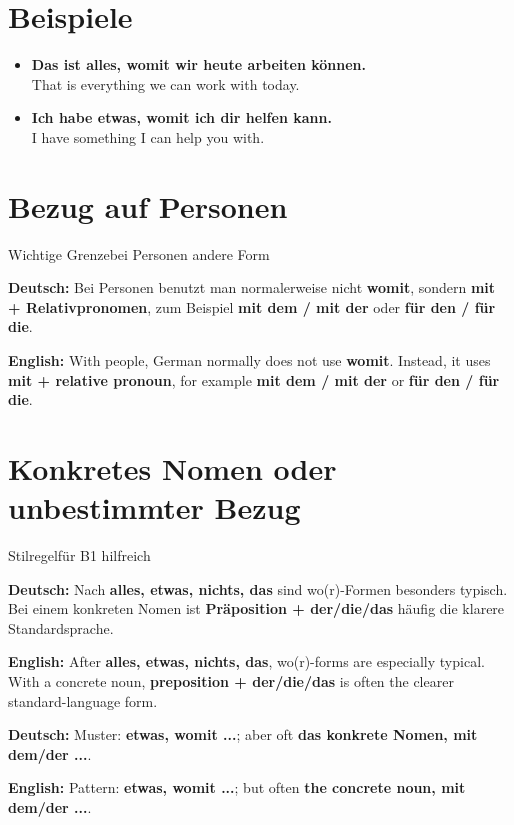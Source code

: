 \documentclass[a4paper,11pt]{article}
\newcommand{\GermanText}[1]{\textbf{Deutsch: }#1\par}
\newcommand{\EnglishText}[1]{{\small\color{SoftGray}\textbf{English: }#1\par}}
\newcommand{\ExampleItem}[2]{\item \textbf{#1}\\{\small\color{SoftGray}#2}}
\begin{document}
\section{Beispiele}

\begin{exbox}

\begin{itemize}

\ExampleItem{Das ist alles, womit wir heute arbeiten können.}{That is everything we can work with today.}

\ExampleItem{Ich habe etwas, womit ich dir helfen kann.}{I have something I can help you with.}

\end{itemize}

\end{exbox}

\section{Bezug auf Personen}

\begin{grammarentry}{Wichtige Grenze}{bei Personen andere Form}

\GermanText{Bei Personen benutzt man normalerweise nicht \textbf{womit}, sondern \textbf{mit + Relativpronomen}, zum Beispiel \textbf{mit dem / mit der} oder \textbf{für den / für die}.}

\EnglishText{With people, German normally does not use \textbf{womit}. Instead, it uses \textbf{mit + relative pronoun}, for example \textbf{mit dem / mit der} or \textbf{für den / für die}.}

\end{grammarentry}

\section{Konkretes Nomen oder unbestimmter Bezug}

\begin{grammarentry}{Stilregel}{für B1 hilfreich}

\GermanText{Nach \textbf{alles, etwas, nichts, das} sind wo(r)-Formen besonders typisch. Bei einem konkreten Nomen ist \textbf{Präposition + der/die/das} häufig die klarere Standardsprache.}

\EnglishText{After \textbf{alles, etwas, nichts, das}, wo(r)-forms are especially typical. With a concrete noun, \textbf{preposition + der/die/das} is often the clearer standard-language form.}

\GermanText{Muster: \textbf{etwas, womit ...}; aber oft \textbf{das konkrete Nomen, mit dem/der ...}.}

\EnglishText{Pattern: \textbf{etwas, womit ...}; but often \textbf{the concrete noun, mit dem/der ...}.}

\end{grammarentry}
\end{document}
